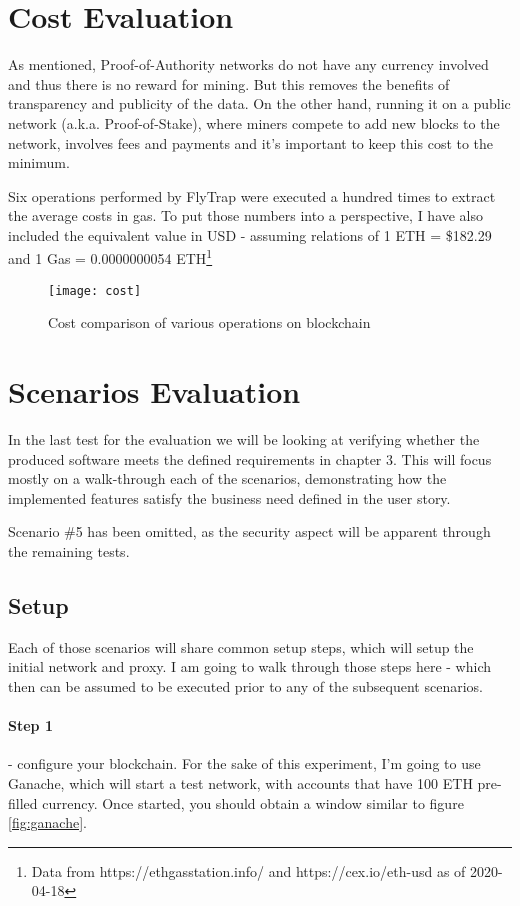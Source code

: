 \section{Cost Evaluation}
As mentioned, Proof-of-Authority networks do not have any currency involved and thus there is no reward for mining. But this removes the benefits of transparency and publicity of the data. On the other hand, running it on a public network (a.k.a. Proof-of-Stake), where miners compete to add new blocks to the network, involves fees and payments and it's important to keep this cost to the minimum.

Six operations performed by FlyTrap were executed a hundred times to extract the average costs in gas. To put those numbers into a perspective, I have also included the equivalent value in USD - assuming relations of 1 ETH = \$182.29 and 1 Gas = 0.0000000054 ETH\footnote{Data from https://ethgasstation.info/ and https://cex.io/eth-usd as of 2020-04-18}

\begin{figure}[h]
    \centering
    \texttt{[image: cost]}
    \caption{Cost comparison of various operations on blockchain}
    \label{fig:cost}
\end{figure}


\section{Scenarios Evaluation}
In the last test for the evaluation we will be looking at verifying whether the produced software meets the defined requirements in chapter 3. This will focus mostly on a walk-through each of the scenarios, demonstrating how the implemented features satisfy the business need defined in the user story.

Scenario \#5 has been omitted, as the security aspect will be apparent through the remaining tests.
\subsection{Setup}
Each of those scenarios will share common setup steps, which will setup the initial network and proxy. I am going to walk through those steps here - which then can be assumed to be executed prior to any of the subsequent scenarios.
\paragraph{Step 1} - configure your blockchain. For the sake of this experiment, I'm going to use Ganache, which will start a test network, with accounts that have 100 ETH pre-filled currency. Once started, you should obtain a window similar to figure \ref{fig:ganache}.
